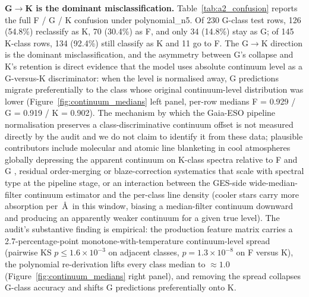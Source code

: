 \documentclass[11pt,a4paper]{article}
\begin{document}
\textbf{G$\to$K is the dominant misclassification.} Table~\ref{tab:a2_confusion} reports the full F / G / K confusion under polynomial\_n5. Of 230 G-class test rows, 126 (54.8\%) reclassify as K, 70 (30.4\%) as F, and only 34 (14.8\%) stay as G; of 145 K-class rows, 134 (92.4\%) still classify as K and 11 go to F. The G$\to$K direction is the dominant misclassification, and the asymmetry between G's collapse and K's retention is direct evidence that the model uses absolute continuum level as a G-versus-K discriminator: when the level is normalised away, G predictions migrate preferentially to the class whose original continuum-level distribution was lower (Figure~\ref{fig:continuum_medians} left panel, per-row medians F = 0.929 / G = 0.919 / K = 0.902). The mechanism by which the Gaia-ESO pipeline normalisation preserves a class-discriminative continuum offset is not measured directly by the audit and we do not claim to identify it from these data; plausible contributors include molecular and atomic line blanketing in cool atmospheres globally depressing the apparent continuum on K-class spectra relative to F and G \citep{GrayCorbally2009}, residual order-merging or blaze-correction systematics that scale with spectral type at the pipeline stage, or an interaction between the GES-side wide-median-filter continuum estimator and the per-class line density (cooler stars carry more absorption per~\AA\ in this window, biasing a median-filter continuum downward and producing an apparently weaker continuum for a given true level). The audit's substantive finding is empirical: the production feature matrix carries a 2.7-percentage-point monotone-with-temperature continuum-level spread (pairwise KS $p \leq 1.6 \times 10^{-3}$ on adjacent classes, $p = 1.3 \times 10^{-8}$ on F versus K), the polynomial re-derivation lifts every class median to $\approx 1.0$ (Figure~\ref{fig:continuum_medians} right panel), and removing the spread collapses G-class accuracy and shifts G predictions preferentially onto K.
\end{document}
